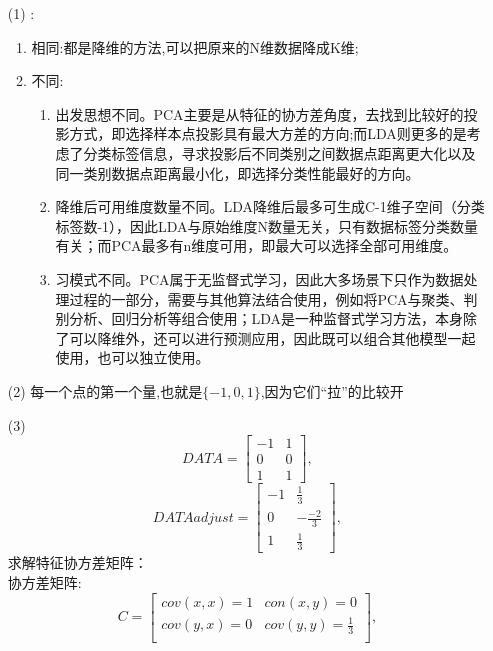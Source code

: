 \documentclass[11pt, a4paper, UTF8]{ctexart}
\begin{document}
\begin{solution}
	\begin{enumerate}
		\item[(1)]:
		\begin{enumerate}\item 相同:都是降维的方法,可以把原来的N维数据降成K维;
			\item 不同:
		\begin{enumerate} 
			\item 出发思想不同。PCA主要是从特征的协方差角度，去找到比较好的投影方式，即选择样本点投影具有最大方差的方向;而LDA则更多的是考虑了分类标签信息，寻求投影后不同类别之间数据点距离更大化以及同一类别数据点距离最小化，即选择分类性能最好的方向。
			\item 降维后可用维度数量不同。LDA降维后最多可生成C-1维子空间（分类标签数-1），因此LDA与原始维度N数量无关，只有数据标签分类数量有关；而PCA最多有n维度可用，即最大可以选择全部可用维度。
			\item 习模式不同。PCA属于无监督式学习，因此大多场景下只作为数据处理过程的一部分，需要与其他算法结合使用，例如将PCA与聚类、判别分析、回归分析等组合使用；LDA是一种监督式学习方法，本身除了可以降维外，还可以进行预测应用，因此既可以组合其他模型一起使用，也可以独立使用。

		\end{enumerate}

		\end{enumerate}
		\item[(2)] 每一个点的第一个量,也就是$\{-1,0,1\}$,因为它们“拉”的比较开
		\item[(3)] \begin{equation}
			DATA={
			\left[ \begin{array}{cc}
			-1 & 1 \\
			0 & 0 \\
			1 & 1 
			\end{array} 
			\right ]},
			\end{equation}
			\begin{equation}
				DATAadjust={
				\left[ \begin{array}{cc}
				-1 & \frac{1}{3} \\
				0 & -\frac{-2}{3} \\
				1 &  \frac{1}{3}
				\end{array} 
				\right ]},
				\end{equation}
				求解特征协方差矩阵：
		\\		协方差矩阵:
		\begin{equation}
			C={
			\left[ \begin{array}{cc}
			cov(x,x)=1 & con(x,y)=0 \\
			cov(y,x)=0 & cov(y,y)=\frac{1}{3} \\
			\end{array} 
			\right ]},
			\end{equation}


\end{enumerate}
\end{solution}
\end{document}
